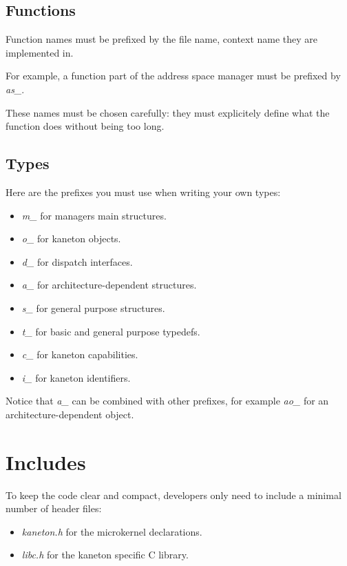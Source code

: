 %
%

\subsection{Functions}

Function names must be prefixed by the file name, context name they are
implemented in.

For example, a function part of the address space manager must be prefixed
by \textit{as\_}.

These names must be chosen carefully: they must explicitely define
what the function does without being too long.

%
%

\subsection{Types}

Here are the prefixes you must use when writing your own types:

\begin{itemize}
  \item
    \textit{m\_} for managers main structures.
  \item
    \textit{o\_} for kaneton objects.
  \item
    \textit{d\_} for dispatch interfaces.
  \item
    \textit{a\_} for architecture-dependent structures.
  \item
    \textit{s\_} for general purpose structures.
  \item
    \textit{t\_} for basic and general purpose typedefs.
  \item
    \textit{c\_} for kaneton capabilities.
  \item
    \textit{i\_} for kaneton identifiers.
\end{itemize}

Notice that \textit{a\_} can be combined with other prefixes, for
example \textit{ao\_} for an architecture-dependent object.

%
%

\section{Includes}

To keep the code clear and compact, developers only need to include a
minimal number of header files:

\begin{itemize}
  \item
    \textit{kaneton.h} for the microkernel declarations.
  \item
    \textit{libc.h} for the kaneton specific C library.
\end{itemize}


